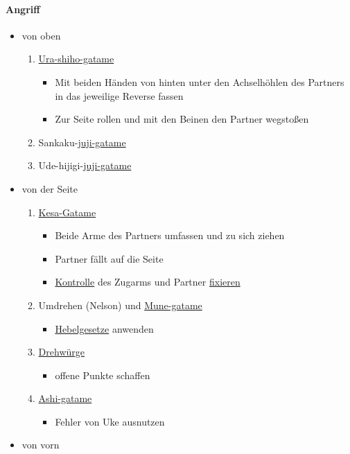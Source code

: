 \documentclass[justified, a4paper, notitlepage, captions=tableheading, nobib]{tufte-handout}
\begin{document}
\paragraph{Angriff}
\label{sec:org7650dd0}

\begin{itemize}
\item von oben
\begin{enumerate}
\item \hyperref[org70b9129]{Ura-shiho-gatame}
\begin{itemize}
\item Mit beiden Händen von hinten unter den Achselhöhlen des Partners in das jeweilige Reverse fassen
\item Zur Seite rollen und mit den Beinen den Partner wegstoßen
\end{itemize}
\item Sankaku-\hyperref[orgd926b87]{juji-gatame}
\item Ude-hijigi-\hyperref[orgd926b87]{juji-gatame}
\end{enumerate}
\item von der Seite
\begin{enumerate}
\item \hyperref[org06d0492]{Kesa-Gatame}
\begin{itemize}
\item Beide Arme des Partners umfassen und zu sich ziehen
\item Partner fällt auf die Seite
\item \hyperref[org15bbf8e]{Kontrolle} des Zugarms und Partner \hyperref[org62822f6]{fixieren}
\end{itemize}
\item Umdrehen (Nelson) und \hyperref[org97af0c8]{Mune-gatame}
\begin{itemize}
\item \hyperref[org6c6f271]{Hebelgesetze} anwenden
\end{itemize}
\item \hyperref[orgf618d5a]{Drehwürge}
\begin{itemize}
\item offene Punkte schaffen
\end{itemize}
\item \hyperref[orgaa5a7e1]{Ashi-gatame}
\begin{itemize}
\item Fehler von Uke ausnutzen
\end{itemize}
\end{enumerate}
\item von vorn

\end{itemize}
\end{document}
